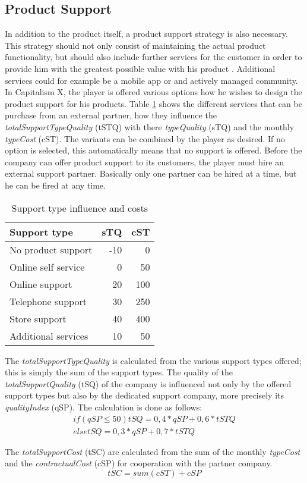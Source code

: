 \subsection{Product Support}  \label{product_support_simulation}

In addition to the product itself, a product support strategy is also necessary. This strategy should not only consist of maintaining the actual product functionality, but should also include further services for the customer in order to provide him with the greatest possible value with his product \cite{markeset_design_2003}. Additional services could for example be a mobile app or and actively managed community.  
In Capitalism X, the player is offered various options how he wishes to design the product support for his products. Table \ref{Support_types} shows the different services that can be purchase from an external partner, how they influence the \textit{totalSupportTypeQuality} (\gls{tSTQ}) with there \textit{typeQuality} (\gls{sTQ}) and the monthly \textit{typeCost} (\gls{cST}). The variants can be combined by the player as desired. If no option is selected, this automatically means that no support is offered.
Before the company can offer product support to its customers, the player must hire an external support partner. Basically only one partner can be hired at a time, but he can be fired at any time.

\begin{table}[ht]
    \centering
    \begin{tabular}{|l|r|r|}
    \hline
    Support type & sTQ & cST \\
    \hline
    No product support   & -10   & 0    \\
    Online self service  & 0     & 50   \\
    Online support       & 20    & 100  \\
    Telephone support    & 30    & 250  \\
    Store support        & 40    & 400  \\
    Additional services  & 10    & 50   \\     
    \hline
    \end{tabular}
    \caption{Support type influence and costs}
    \label{Support_types}
\end{table}

The \textit{totalSupportTypeQuality} is calculated from the various support types offered; this is simply the sum of the support types. The quality of the \textit{totalSupportQuality} (\gls{tSQ}) of the company is influenced not only by the offered support types but also by the dedicated support company, more precisely its \textit{qualityIndex} (\gls{qSP}). The calculation is done as follows:
\begin{equation}
\label{func:totalProductSupport}
\begin{aligned}
    if ( qSP \leq  50 ) tSQ = { 0,4 *qSP + 0,6 * tSTQ } \\
    else tSQ = { 0,3 * qSP + 0,7 * tSTQ }
\end{aligned}
\end{equation}

The \textit{totalSupportCost} (\gls{tSC}) are calculated from the sum of the monthly \textit{typeCost} and the \textit{contractualCost} (\gls{cSP}) for cooperation with the partner company.
\begin{equation}
\label{func:totalSupportCost}
    tSC = sum (cST) + cSP
\end{equation}